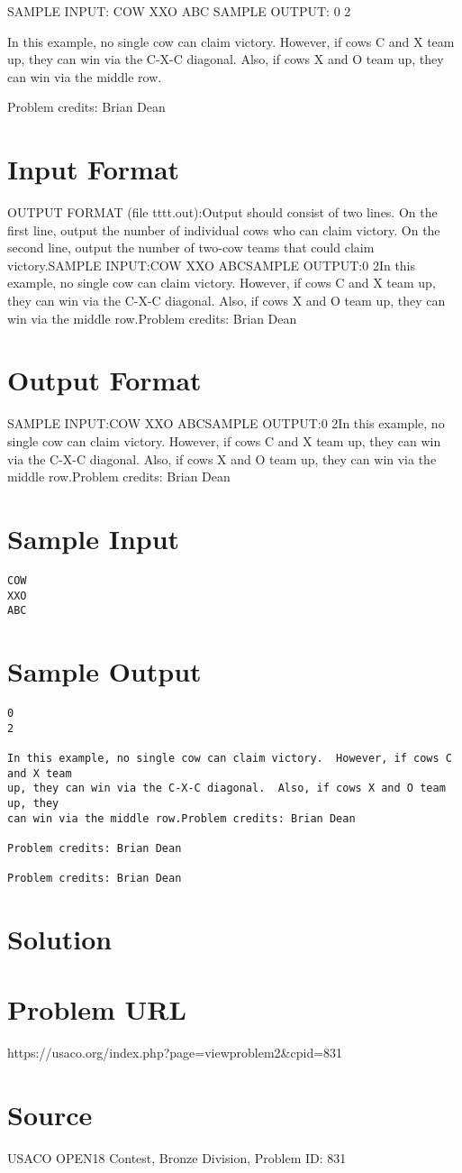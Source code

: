 \documentclass[12pt]{article}
\begin{document}
SAMPLE INPUT:
COW
XXO
ABC
SAMPLE OUTPUT: 
0
2

In this example, no single cow can claim victory.  However, if cows C and X team
up, they can win via the C-X-C diagonal.  Also, if cows X and O team up, they
can win via the middle row.


Problem credits: Brian Dean



\section*{Input Format}
OUTPUT FORMAT (file tttt.out):Output should consist of two lines.  On the first line, output the number of
individual cows who can claim victory.  On the second line, output the number
of two-cow teams that could claim victory.SAMPLE INPUT:COW
XXO
ABCSAMPLE OUTPUT:0
2In this example, no single cow can claim victory.  However, if cows C and X team
up, they can win via the C-X-C diagonal.  Also, if cows X and O team up, they
can win via the middle row.Problem credits: Brian Dean

\section*{Output Format}
SAMPLE INPUT:COW
XXO
ABCSAMPLE OUTPUT:0
2In this example, no single cow can claim victory.  However, if cows C and X team
up, they can win via the C-X-C diagonal.  Also, if cows X and O team up, they
can win via the middle row.Problem credits: Brian Dean

\section*{Sample Input}
\begin{verbatim}
COW
XXO
ABC
\end{verbatim}

\section*{Sample Output}
\begin{verbatim}
0
2

In this example, no single cow can claim victory.  However, if cows C and X team
up, they can win via the C-X-C diagonal.  Also, if cows X and O team up, they
can win via the middle row.Problem credits: Brian Dean

Problem credits: Brian Dean

Problem credits: Brian Dean
\end{verbatim}

\section*{Solution}


\section*{Problem URL}
https://usaco.org/index.php?page=viewproblem2&cpid=831

\section*{Source}
USACO OPEN18 Contest, Bronze Division, Problem ID: 831
\end{document}

